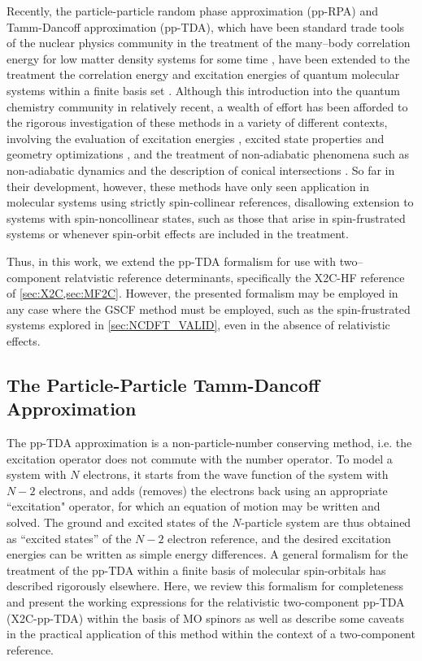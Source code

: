 Recently, the particle-particle random phase approximation (pp-RPA) and 
Tamm-Dancoff approximation (pp-TDA), which have been standard trade tools of 
the nuclear physics community in the treatment of the many--body correlation energy for low matter density 
systems for some time \cite{SchuckBook_04}, 
have been extended to the treatment the correlation energy and excitation energies of quantum 
molecular systems within a finite basis set \cite{Yang13_224105,Yang13_18A522,
Yang13_174110,Yang13_104112,Yang13_030501,Yang09_066403,Bulik13_104113}.  Although this 
introduction into the quantum chemistry community in relatively recent, a wealth 
of effort has been afforded to the rigorous investigation of these methods in a 
variety of different contexts, involving the evaluation of excitation 
energies \cite{Yang13_224105,Yang13_18A522,Yang13_174110}, excited state properties 
and geometry optimizations \cite{Yang15_1025}, and the treatment of non-adiabatic 
phenomena such as non-adiabatic dynamics \cite{Liu14_244105} and the description 
of conical intersections \cite{Yang16_2407}.  So far in their development, however, 
these methods have only seen application in molecular systems using strictly 
spin-collinear references, disallowing extension to systems with 
spin-noncollinear states, such as those that arise in spin-frustrated systems 
or whenever spin-orbit effects are included in the treatment.

Thus, in this work, we extend the pp-TDA formalism for use with two--component
relatvistic reference determinants, specifically the X2C-HF reference of \cref{sec:X2C,sec:MF2C}. 
However, the presented formalism may be employed in any case where the GSCF method must be
employed, such as the spin-frustrated systems explored in \cref{sec:NCDFT_VALID},
even in the absence of relativistic effects. 




\subsection{The Particle-Particle Tamm-Dancoff Approximation}
\label{subsec:ppTDA}
The pp-TDA approximation is a non-particle-number conserving method, i.e. the excitation operator does not commute with the number operator. To model a system with $N$ electrons, it starts from the wave function of the system with $N-2$  electrons, and adds (removes) the electrons back using an appropriate ``excitation" operator, for which an equation of motion may be written and solved.
The ground and excited states of the $N$-particle system are thus obtained as ``excited states'' of the $N-2$ electron reference, and the desired excitation energies can be written as simple energy differences.
A general formalism for the treatment of the pp-TDA within a finite basis of molecular spin-orbitals has described rigorously elsewhere.
\cite{Yang13_224105,Yang13_18A522,Yang13_104112}
Here, we review this formalism for completeness and present the working expressions for the relativistic two-component pp-TDA (X2C-pp-TDA) within the basis of MO spinors as well as describe some caveats in the practical application of this method within the context of a two-component reference.

